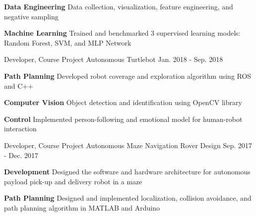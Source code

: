 \begin{cventries}
{\begin{cvitems}
			\item {\textbf{Data Engineering} Data collection, visualization, feature engineering, and negative sampling}
			\item {\textbf{Machine Learning} Trained and benchmarked 3 supervised learning models: Random Forest, SVM, and MLP Network}
		\end{cvitems}
	}
	\cventry
	{Developer, Course Project}
	{Autonomous Turtlebot}
	{Jan. 2018 - Sep. 2018}
	{}
	{
		\begin{cvitems}
			\item {\textbf{Path Planning} Developed robot coverage and exploration algorithm using ROS and C++}
			\item {\textbf{Computer Vision} Object detection and identification using OpenCV library}
			\item {\textbf{Control} Implemented person-following and emotional model for human-robot interaction}
		\end{cvitems}
	}
	\cventry
	{Developer, Course Project}
	{Autonomous Maze Navigation Rover Design}
	{Sep. 2017 - Dec. 2017}
	{}
	{
		\begin{cvitems}
			\item { \textbf{Development} Designed the software and hardware architecture for autonomous payload pick-up and delivery robot in a maze}
			\item { \textbf{Path Planning} Designed and implemented localization, collision avoidance, and path planning algorithm in MATLAB and Arduino}
		\end{cvitems}
	}
\end{cventries}
